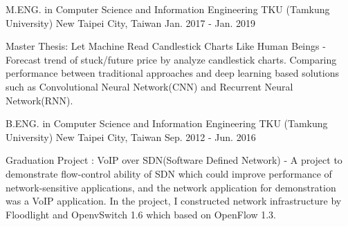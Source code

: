 

\begin{cventries}

    \cventry
        {M.ENG. in Computer Science and Information Engineering}
        {TKU (Tamkung University)}
        {New Taipei City, Taiwan}
        {Jan. 2017 - Jan. 2019}
        {
            \begin{cvitems}
                \item 
                    {
                        Master Thesis: Let Machine Read Candlestick Charts Like Human Beings - Forecast trend of stuck/future price by analyze candlestick charts. Comparing performance between traditional approaches and deep learning based solutions such as Convolutional Neural Network(CNN) and Recurrent Neural Network(RNN).
                    }
            \end{cvitems}
        }

    \cventry
        {B.ENG. in Computer Science and Information Engineering}
        {TKU (Tamkung University)}
        {New Taipei City, Taiwan}
        {Sep. 2012 - Jun. 2016}
        {
            \begin{cvitems}
                \item 
                    {
                        Graduation Project : VoIP over SDN(Software Defined Network) - A project to demonstrate flow-control ability of SDN which could improve performance of network-sensitive applications, and the network application for demonstration was a VoIP application. In the project, I constructed network infrastructure by Floodlight and OpenvSwitch 1.6 which based on OpenFlow 1.3.
                    }
            \end{cvitems}
        }
    


\end{cventries}

